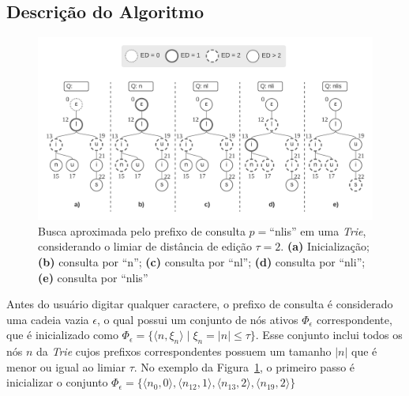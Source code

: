 \subsection{Descrição do Algoritmo}

\begin{figure}[ht]
    \centering
    \includegraphics[width=1\textwidth]{figures/ican_example.png}
    \caption{Busca aproximada pelo prefixo de consulta $p=$``nlis'' em uma \textit{Trie}, considerando o limiar de distância de edição $\tau = 2$. \textbf{(a)} Inicialização; \textbf{(b)} consulta por ``n''; \textbf{(c)} consulta por ``nl''; \textbf{(d)} consulta por ``nli''; \textbf{(e)} consulta por ``nlis'' }
    \label{fig:ican_example}
\end{figure}

Antes do usuário digitar qualquer caractere, o prefixo de consulta é considerado uma cadeia vazia $\epsilon$, o qual possui um conjunto de nós ativos $\Phi_{\epsilon}$ correspondente, que é inicializado como $\Phi_{\epsilon} = \{\langle n, \xi_{n} \rangle \mid \xi_{n} = |n| \leq \tau\}$. Esse conjunto inclui todos os nós $n$ da \textit{Trie} cujos prefixos correspondentes possuem um tamanho $|n|$ que é menor ou igual ao limiar $\tau$. No exemplo da Figura~\ref{fig:ican_example}, o primeiro passo é inicializar o conjunto $\Phi_{\epsilon} = \{ \langle n_{0}, 0\rangle, \langle n_{12}, 1\rangle,  \langle n_{13}, 2\rangle,  \langle n_{19}, 2\rangle \}$

